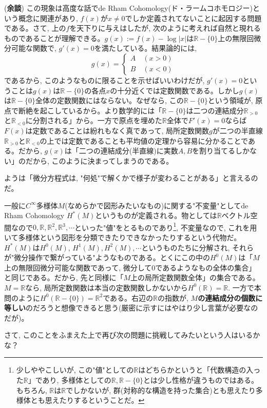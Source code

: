 \documentclass[twocolumn]{jbook}
\theoremstyle{definition}
\newcommand{\bcas}{\begin{cases}}
\newcommand{\ecas}{\end{cases}}
\newcommand{\mb}{\mathbb}
\begin{document}
(\textbf{余談}) この現象は高度な話でde Rham Cohomology(ド・ラームコホモロジー)という概念に関連があり, $f(x)$が$x\neq 0$でしか定義されてないことに起因する問題である。さて, 上の$f$を天下りに与えはしたが, 次のように考えれば自然と現れるものであることが理解できる。$g(x) := f(x) - \log{|x|}$は$\mb{R}-\{ 0 \}$上の無限回微分可能な関数で, $g'(x) = 0$を満たしている。結果論的には, 
\[
g(x) = \bcas
A\quad (x > 0)\\
B\quad (x < 0)
\ecas
\]
であるから, このようなものに限ることを示せばいいわけだが, $g'(x) = 0$ということは$g(x)$は$\mb{R}-\{ 0 \}$の各点$x$の十分近くでは定数関数である。しかし$g(x)$は$\mb{R} - \{ 0 \}$全体の定数関数にはならない。なぜなら, この$\mb{R} - \{ 0 \}$という領域が, 原点で断絶を起こしているから。より数学的には「$\mb{R} - \{ 0 \}$は二つの連結成分$\mb{R}_{>0}$と$\mb{R}_{<0}$に分割される」から。一方で原点を埋めた$\mb{R}$全体で$F'(x) = 0$ならば$F(x)$は定数であることは紛れもなく真であって, 局所定数関数$g$が二つの半直線$\mb{R}_{>0}$と$\mb{R}_{<0}$の上では定数であることも平均値の定理から容易に分かることである。だから, $g(x)$は「二つの連結成分(半直線)に実数$A,B$を割り当てるしかない」のだから, このように決まってしまうのである。

ようは「微分方程式は, "何処"で解くかで様子が変わることがある」と言えるのだ。

一般に$C^{\infty}$多様体$M$(なめらかで図形みたいなもの)に関する"不変量"としてde Rham Cohomology $H^{\ast}(M)$というものが定義される。物としては$\mb{R}$ベクトル空間なので$0,\mb{R},\mb{R}^2,\mb{R}^3,\cdots$といった"値"をとるものであり\footnote{少しややこしいが, この"値"としての$\mb{R}$はどちらかというと「代数構造の入った$\mb{R}$」であり, 多様体としての$\mb{R}, \mb{R}-\{ 0 \}$とは少し性格が違うものではある。もちろん, $\mb{R}$は$\mb{R}$でしかないが, 群(対称的な構造を持った集合)とも思えたり多様体とも思えたりするということだ。}, 不変量なので, これを用いて多様体という図形を分類できたりできなかったりするという代物だ。$H^{\ast}(M)$は$H^{0}(M)$, $H^{1}(M),H^{2}(M),\cdots$というものたちに分解され, それらが"微分操作で繋がっている"ようなものである。とくにこの中の$H^{0}(M)$は「$M$上の無限回微分可能な関数であって, 微分して$0$であるようなもの全体の集合」と同じである。だから, 先と同様に「$M$上の局所定数関数全体」の集合である。$M=\mb{R}$なら, 局所定数関数は本当の定数関数しかないから$H^{0}(\mb{R}) = \mb{R}$.  一方で本問のように$H^{0}(\mb{R}-\{ 0 \}) = \mb{R}^2$である。右辺の$\mb{R}$の指数が, \textbf{$M$の連結成分の個数に等しい}のだろうと想像できると思う(厳密に示すにはやはり少し言葉が必要なのだが)。

さて, このことをふまえた上で再び次の問題に挑戦してみたいという人はいるかな？
\end{document}
